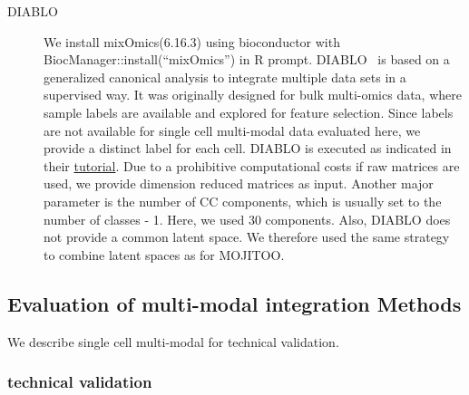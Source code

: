 \begin{description}
\item[DIABLO]
We install mixOmics(6.16.3) using bioconductor with BiocManager::install(``mixOmics'') in R prompt.
DIABLO~\cite{singh2019diablo} is based on a generalized canonical analysis to integrate multiple data sets in a supervised way. It was originally designed for bulk multi-omics data, where sample labels are available and explored for feature selection. Since labels are not available for single cell multi-modal data evaluated here, we provide a distinct label for each cell. DIABLO is executed as indicated in their \href{http://mixomics.org/mixdiablo/}{tutorial}. Due to a prohibitive computational costs if raw matrices are used, we provide dimension reduced matrices as input.  Another major parameter is the number of CC components, which is usually set to the number of classes - 1. Here, we used 30 components. Also, DIABLO does not provide a common latent space. We therefore used the same strategy to combine latent spaces as for MOJITOO. 
\end{description}


\subsection{Evaluation of multi-modal integration Methods}
We describe single cell multi-modal for technical validation.

\subsubsection{technical validation}

